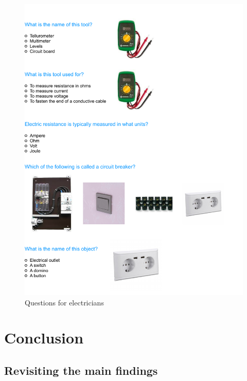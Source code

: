 \documentclass[
  a4paper, twoside, 12pt]{book}
\newcommand{\newsection}{\setcounter{figure}{0}
\renewcommand{\thefigure}{\arabic{chapter}.\arabic{figure}}
\setcounter{table}{0}
\renewcommand{\thetable}{\arabic{chapter}.\arabic{table}}}
\begin{document}
\begin{singlespacing}
\begin{figure}[H]
\includegraphics{figures/questionnaire/electricians} \caption{\label{fig:qs_electricians}Questions for electricians}\label{fig:unnamed-chunk-10}
\end{figure}
\end{singlespacing}

\renewcommand{\thesection}{\arabic{chapter}.\arabic{section}}
\setcounter{section}{0}
\renewcommand{\thesubsection}{\arabic{chapter}.\arabic{section}.\arabic{subsection}}
\setcounter{subsection}{0}

\newsection

\chapter{Conclusion}

\hypertarget{revisiting-the-main-findings}{%
\section{Revisiting the main findings}\label{revisiting-the-main-findings}}

\newpage

\newpage

\printbibliography[heading=bibintoc]
\end{document}
